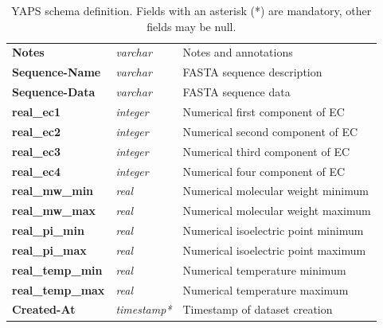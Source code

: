 \begin{table}[H]
\begin{tabular}{| l | l | l |}
\textbf{Notes} & \textit{varchar} & Notes and annotations\\
\textbf{Sequence-Name} & \textit{varchar} & FASTA sequence description\\
\textbf{Sequence-Data} & \textit{varchar} & FASTA sequence data\\
\textbf{real\_ec1} & \textit{integer} & Numerical first component of EC\\
\textbf{real\_ec2} & \textit{integer} & Numerical second component of EC\\
\textbf{real\_ec3} & \textit{integer} & Numerical third component of EC\\
\textbf{real\_ec4} & \textit{integer} & Numerical four component of EC\\
\textbf{real\_mw\_min} & \textit{real} & Numerical molecular weight minimum\\
\textbf{real\_mw\_max} & \textit{real} & Numerical molecular weight maximum\\
\textbf{real\_pi\_min} & \textit{real} & Numerical isoelectric point minimum\\
\textbf{real\_pi\_max} & \textit{real} & Numerical isoelectric point maximum\\
\textbf{real\_temp\_min} & \textit{real} & Numerical temperature minimum\\
\textbf{real\_temp\_max} & \textit{real} & Numerical temperature maximum\\
\textbf{Created-At} & \textit{timestamp*} & Timestamp of dataset creation\\
\hline
\end{tabular}
\caption[YAPS schema]
        {YAPS schema definition. Fields with an asterisk (*) are
         mandatory, other fields may be null.}
\label{tab:yaps-schema}
\end{table}




